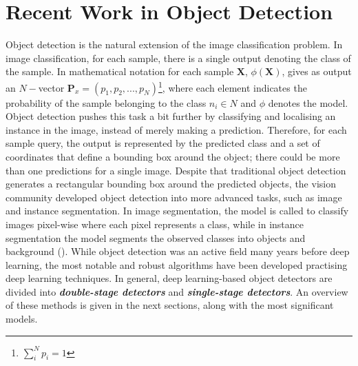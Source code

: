 \chapter{Recent Work in Object Detection} \label{Chapter:ObjectDetection}

Object detection is the natural extension of the image classification problem. In image classification, for each sample, there is a single output denoting the class of the sample. In mathematical notation for each sample $\textbf{X}$, $\phi(\textbf{X})$, gives as output an $N-$vector $\textbf{P}_x=(p_1,p_2,...,p_N)$\footnote{$\sum^N_i p_i=1$}, where each element indicates the probability of the sample belonging to the class $n_i \in N$ and $\phi$ denotes the model. Object detection pushes this task a bit further by classifying and localising an instance in the image, instead of merely making a prediction. Therefore, for each sample query, the output is represented by the predicted class and a set of coordinates that define a bounding box around the object; there could be more than one predictions for a single image. Despite that traditional object detection generates a rectangular bounding box around the predicted objects, the vision community developed object detection into more advanced tasks, such as image and instance segmentation. In image segmentation, the model is called to classify images pixel-wise where each pixel represents a class, while in instance segmentation the model segments the observed classes into objects and background (). While object detection was an active field many years before deep learning, the most notable and robust algorithms have been developed practising deep learning techniques. In general, deep learning-based object detectors are divided into \textbf{\textit{double-stage detectors}} and \textbf{\textit{single-stage detectors}}. An overview of these methods is given in the next sections, along with the most significant models. 

